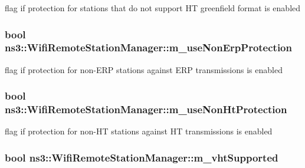 flag if protection for stations that do not support HT greenfield format is enabled 

\subsubsection[{\texorpdfstring{m\+\_\+use\+Non\+Erp\+Protection}{m_useNonErpProtection}}]{\setlength{\rightskip}{0pt plus 5cm}bool ns3\+::\+Wifi\+Remote\+Station\+Manager\+::m\+\_\+use\+Non\+Erp\+Protection\hspace{0.3cm}{\ttfamily [private]}}\hypertarget{classns3_1_1WifiRemoteStationManager_af5192c20c737ca1b2f054914272c89f4}{}\label{classns3_1_1WifiRemoteStationManager_af5192c20c737ca1b2f054914272c89f4}


flag if protection for non-\/\+E\+RP stations against E\+RP transmissions is enabled 

\subsubsection[{\texorpdfstring{m\+\_\+use\+Non\+Ht\+Protection}{m_useNonHtProtection}}]{\setlength{\rightskip}{0pt plus 5cm}bool ns3\+::\+Wifi\+Remote\+Station\+Manager\+::m\+\_\+use\+Non\+Ht\+Protection\hspace{0.3cm}{\ttfamily [private]}}\hypertarget{classns3_1_1WifiRemoteStationManager_a4205e24475f15413af70fb8225044525}{}\label{classns3_1_1WifiRemoteStationManager_a4205e24475f15413af70fb8225044525}


flag if protection for non-\/\+HT stations against HT transmissions is enabled 

\subsubsection[{\texorpdfstring{m\+\_\+vht\+Supported}{m_vhtSupported}}]{\setlength{\rightskip}{0pt plus 5cm}bool ns3\+::\+Wifi\+Remote\+Station\+Manager\+::m\+\_\+vht\+Supported\hspace{0.3cm}{\ttfamily [private]}}\hypertarget{classns3_1_1WifiRemoteStationManager_aca8ce44bedaee4dbe872057904ff678b}{}\label{classns3_1_1WifiRemoteStationManager_aca8ce44bedaee4dbe872057904ff678b}


